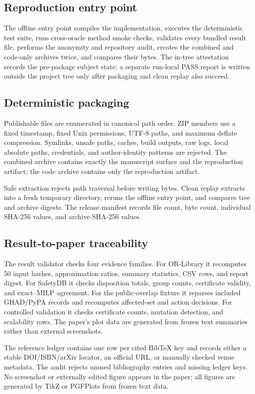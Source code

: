 \documentclass[10pt,conference]{IEEEtran}
\begin{document}
\subsection{Reproduction entry point}
The offline entry point compiles the implementation, executes the deterministic test suite, runs cross-oracle method smoke checks, validates every bundled result file, performs the anonymity and repository audit, creates the combined and code-only archives twice, and compares their bytes. The in-tree attestation records the pre-package subject state; a separate run-local PASS report is written outside the project tree only after packaging and clean replay also succeed.

\subsection{Deterministic packaging}
Publishable files are enumerated in canonical path order. ZIP members use a fixed timestamp, fixed Unix permissions, UTF-8 paths, and maximum deflate compression. Symlinks, unsafe paths, caches, build outputs, raw logs, local absolute paths, credentials, and author-identity patterns are rejected. The combined archive contains exactly the manuscript surface and the reproduction artifact; the code archive contains only the reproduction artifact.

Safe extraction rejects path traversal before writing bytes. Clean replay extracts into a fresh temporary directory, reruns the offline entry point, and compares tree and archive digests. The release manifest records file count, byte count, individual SHA-256 values, and archive SHA-256 values.

\subsection{Result-to-paper traceability}
The result validator checks four evidence families. For OR-Library it recomputes 50 input hashes, approximation ratios, summary statistics, CSV rows, and report digest. For SafetyDB it checks disposition totals, group counts, certificate validity, and exact--MILP agreement. For the public-overlap fixture it reparses included GHAD/PyPA records and recomputes affected-set and action decisions. For controlled validation it checks certificate counts, mutation detection, and scalability rows. The paper's plot data are generated from frozen text summaries rather than external screenshots.

The reference ledger contains one row per cited BibTeX key and records either a stable DOI/ISBN/arXiv locator, an official URL, or manually checked venue metadata. The audit rejects unused bibliography entries and missing ledger keys. No screenshot or externally edited figure appears in the paper; all figures are generated by TikZ or PGFPlots from frozen text data.
\end{document}
